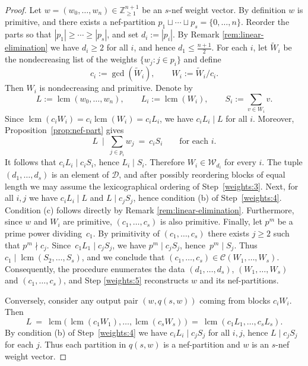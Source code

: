 \documentclass{amsart}
\DeclareMathOperator{\lcm}{lcm}
\newcommand{\Z}{\mathbb{Z}}
\theoremstyle{definition}
\begin{document}
\begin{proof}
Let $w=(w_0,\dots,w_n)\in\Z_{\ge 1}^{n+1}$ be an $s$-nef weight vector. By definition $w$ is primitive, and there exists a nef-partition
$p_1\sqcup\cdots\sqcup p_s=\{0,\dots,n\}$.
Reorder the parts so that $|p_1|\ge\cdots\ge |p_s|$, and set $d_i:=|p_i|$. By Remark \ref{rem:linear-elimination} we have $d_i\geq 2$ for all $i$, and hence $d_1\leq\frac{n+1}{2}$.
For each $i$, let $\widetilde W_i$ be the nondecreasing list of the weights $\{w_j : j\in p_i\}$ and define
\[
c_i:=\gcd(\widetilde W_i),\qquad W_i:=\widetilde W_i/c_i.
\]
Then $W_i$ is nondecreasing and primitive. Denote by
\[
L:=\lcm(w_0,\dots,w_n),\qquad L_i:=\lcm(W_i),\qquad S_i:=\sum_{v\in W_i} v.
\]
Since $\lcm(c_iW_i)=c_i\lcm(W_i)=c_iL_i$, we have $c_iL_i \mid L$ for all $i$.
Moreover, Proposition~\ref{prop:nef-part} gives
\[
L \ \mid \ \sum_{j\in p_i} w_j \ =\ c_i S_i \qquad \text{for each } i.
\]
It follows that $c_iL_i \mid c_iS_i$, hence $L_i \mid S_i$. Therefore $W_i\in\mathcal{W}_{d_i}$ for every $i$.
The tuple $(d_1,\dots,d_s)$ is an element of $\mathcal{D}$, and after possibly reordering blocks of equal length we may assume the lexicographical ordering of Step~\ref{weights:3}. Next, for all $i,j$ we have $c_iL_i \mid L$ and $L\mid c_jS_j$, hence condition (b) of Step~\ref{weights:4}. Condition (c) follows directly by Remark     \ref{rem:linear-elimination}.
Furthermore, since $w$ and $W_i$ are primitive, $(c_1,\dots,c_s)$ is also primitive.
Finally, let $p^m$ be a prime power dividing~$c_1$.
By primitivity of $(c_1,\dots,c_s)$ there exists $j\ge 2$ such that $p^m\nmid c_j$.
Since~$c_1L_1 \mid c_jS_j$, we have $p^m \mid c_jS_j$, hence~$p^m \mid S_j$.
Thus $c_1 \mid \lcm(S_2,\dots,S_s)$, and we conclude that $(c_1,\dots,c_s)\in\mathcal{C}(W_1,\dots,W_s)$.
Consequently, the procedure enumerates the data $(d_1,\dots,d_s)$, $(W_1,\dots,W_s)$ and $(c_1,\dots,c_s)$, and Step \ref{weights:5} reconstructs $w$ and its nef-partitions.

Conversely, consider any output pair $(w,q(s,w))$ coming from blocks $c_iW_i$. Then
\[
L \ =\ \lcm\bigl(\,\lcm(c_1W_1),\dots,\lcm(c_sW_s)\,\bigr)
\ =\ \lcm(c_1L_1,\dots,c_sL_s).
\]
By condition (b) of Step~\ref{weights:4} we have $c_iL_i \mid c_jS_j$ for all $i,j$, hence $L \mid c_jS_j$ for each $j$. Thus each partition in $q(s,w)$ is a nef-partition and $w$ is an $s$-nef weight vector.
\end{proof}
\end{document}
